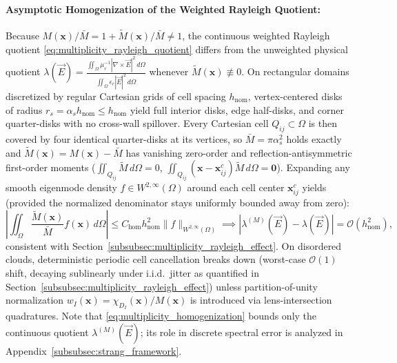 \documentclass[VANCOUVER]{USG}
\begin{document}
\paragraph*{Asymptotic Homogenization of the Weighted Rayleigh Quotient:\hspace*{0.35em}}
Because $M(\mathbf{x})/\bar{M} = 1 + \widetilde{M}(\mathbf{x})/\bar{M} \ne 1$, the continuous weighted Rayleigh quotient \eqref{eq:multiplicity_rayleigh_quotient} differs from the unweighted physical quotient $\lambda(\vec{E}) = \frac{\iint_\Omega \mu_r^{-1}|\nabla\times\vec{E}|^2\,d\Omega}{\iint_\Omega \epsilon_r|\vec{E}|^2\,d\Omega}$ whenever $\widetilde{M}(\mathbf{x}) \not\equiv 0$. On rectangular domains discretized by regular Cartesian grids of cell spacing $h_{\mathrm{nom}}$, vertex-centered disks of radius $r_s = \alpha_s h_{\mathrm{nom}} \le h_{\mathrm{nom}}$ yield full interior disks, edge half-disks, and corner quarter-disks with no cross-wall spillover. Every Cartesian cell $Q_{ij} \subset \Omega$ is then covered by four identical quarter-disks at its vertices, so $\bar{M} = \pi\alpha_s^2$ holds exactly and $\widetilde{M}(\mathbf{x}) = M(\mathbf{x}) - \bar{M}$ has vanishing zero-order and reflection-antisymmetric first-order moments ($\iint_{Q_{ij}} \widetilde{M}\,d\Omega = 0$, $\iint_{Q_{ij}} (\mathbf{x}-\mathbf{x}_{ij}^c)\widetilde{M}\,d\Omega = \mathbf{0}$). Expanding any smooth eigenmode density $f \in W^{2,\infty}(\Omega)$ around each cell center $\mathbf{x}_{ij}^c$ yields (provided the normalized denominator stays uniformly bounded away from zero):
\begin{equation}
    \left| \iint_{\Omega} \frac{\widetilde{M}(\mathbf{x})}{\bar{M}} f(\mathbf{x}) \, d\Omega \right| \le C_{\mathrm{hom}} h_{\mathrm{nom}}^2 \|f\|_{W^{2,\infty}(\Omega)} \implies \left| \lambda^{(M)}(\vec{E}) - \lambda(\vec{E}) \right| = \mathcal{O}(h_{\mathrm{nom}}^2),
    \label{eq:multiplicity_homogenization}
\end{equation}
consistent with Section~\ref{subsubsec:multiplicity_rayleigh_effect}. On disordered clouds, deterministic periodic cell cancellation breaks down (worst-case $\mathcal{O}(1)$ shift, decaying sublinearly under i.i.d.\ jitter as quantified in Section~\ref{subsubsec:multiplicity_rayleigh_effect}) unless partition-of-unity normalization $w_I(\mathbf{x}) = \chi_{D_I}(\mathbf{x})/M(\mathbf{x})$ is introduced via lens-intersection quadratures. Note that \eqref{eq:multiplicity_homogenization} bounds only the continuous quotient $\lambda^{(M)}(\vec{E})$; its role in discrete spectral error is analyzed in Appendix~\ref{subsubsec:strang_framework}.
\end{document}
